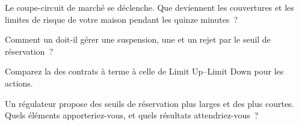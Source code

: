 \begin{interviewq}\label{iq:mx:circuit-breakers-and-halts:3}
Le coupe-circuit de marché se déclenche. Que deviennent les couvertures et les limites de risque de votre maison pendant les quinze minutes~?
\end{interviewq}

\begin{interviewq}\label{iq:mx:circuit-breakers-and-halts:4}
Comment un  doit-il gérer une suspension, une  et un rejet par le seuil de réservation~?
\end{interviewq}

\begin{interviewq}\label{iq:mx:circuit-breakers-and-halts:5}
Comparez la  des contrats à terme à celle de Limit Up--Limit Down pour les actions.
\end{interviewq}

\begin{interviewq}\label{iq:mx:circuit-breakers-and-halts:6}
Un régulateur propose des seuils de réservation plus larges et des  plus courtes. Quels éléments apporteriez-vous, et quels résultats attendriez-vous~?
\end{interviewq}
